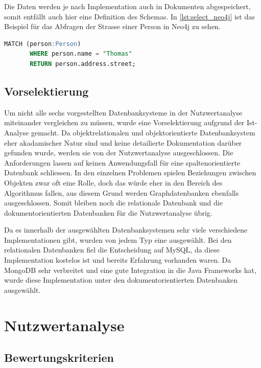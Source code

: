 Die Daten werden je nach Implementation auch in Dokumenten abgespeichert, somit entfällt auch hier eine Definition des Schemas. In \autoref{lst:select_neo4j} ist das Beispiel 
für das Abfragen der Strasse einer Person in Neo4j zu sehen.

\begin{lstlisting}[language=SQL, caption=Abfrage in Neo4j, label=lst:select_neo4j]  
       MATCH (person:Person)
       WHERE person.name = "Thomas"
       RETURN person.address.street;
\end{lstlisting}

\subsection{Vorselektierung}\label{preselection}
Um nicht alle sechs vorgestellten Datenbanksysteme in der Nutzwertanalyse miteinander vergleichen zu müssen, wurde eine Vorselektierung aufgrund der Ist-Analyse gemacht. Da 
objektrelationalen und objektorientierte Datenbanksystem eher akadamischer Natur sind und keine detailierte Dokumentation darüber gefunden wurde, werden sie von der Nutzwertanalyse 
ausgeschlossen. Die Anforderungen lassen auf keinen Anwendungsfall für eine spaltenorientierte Datenbank schliessen. In den einzelnen Problemen spielen Beziehungen zwischen Objekten 
zwar oft eine Rolle, doch das würde eher in den Bereich des Algorithmus fallen, aus diesem Grund werden Graphdatenbanken ebenfalls ausgeschlossen. Somit bleiben noch die relationale 
Datenbank und die dokumentorientierten Datenbanken für die Nutzwertanalyse übrig.

Da es innerhalb der ausgewählten Datenbanksystemen sehr viele verschiedene Implementationen gibt, wurden von jedem Typ eine ausgewählt. Bei den relationalen Datenbanken fiel die 
Entscheidung auf MySQL, da diese Implementation kostelos ist und bereits Erfahrung vorhanden waren. Da MongoDB sehr verbreitet und eine gute Integration in die Java Frameworks hat, 
wurde diese Implementation unter den dokumentorientierten Datenbanken ausgewählt.

\newpage
\section{Nutzwertanalyse}\label{architektur_nutzwertanalyse}

\subsection{Bewertungskriterien}\label{architektur_bewertungspunkte}

